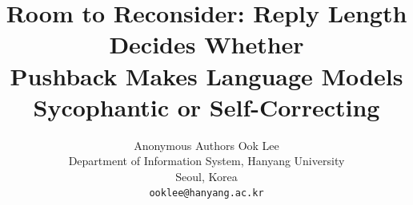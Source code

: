 \documentclass[11pt]{article}
\title{Room to Reconsider: Reply Length Decides Whether\\Pushback Makes Language Models Sycophantic or Self-Correcting}
\author{
\ifanonymous
  Anonymous Authors
\else
  Ook Lee \\
  Department of Information System, Hanyang University \\
  Seoul, Korea \\
  \texttt{ooklee@hanyang.ac.kr}
\fi
}
\date{}
\begin{document}
\maketitle


\begin{abstract}

\end{abstract}



\FloatBarrier



\appendix

\end{document}
